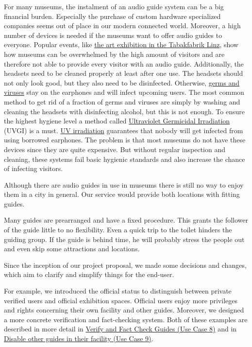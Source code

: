 \documentclass[12pt]{article}
\theoremstyle{definition}
\newenvironment{text}{
   \setlength{\parindent}{0pt}
   \color{black}
}{}
\begin{document}
\begin{text}
For many museums, the instalment of an audio guide system can be a big financial burden. Especially the purchase of custom hardware specialized companies seems out of place in our modern connected world. Moreover, a  high number of devices is needed if the museums want to offer audio guides to everyone. Popular events, like \href{https://www.tips.at/nachrichten/linz/kultur/459167-oberoesterreich-im-kunstfieber-schon-ueber-15-000-besucher-kamen-zu-den-grossen-meistern-in-die-tabakfabrik-linz}{the art exhibition in the Tabakfabrik Linz}, show how museums can be overwhelmed by the high amount of visitors and are therefore not able to provide every visitor with an audio guide.
Additionally, the headsets need to be cleaned properly at least after one use.
The headsets should not only look good, but they also need to be disinfected. Otherwise, \href{https://www.sciencedirect.com/science/article/abs/pii/S019607098580048X}{germs and viruses} stay on the earphones and will infect upcoming users. The most common method to get rid of a fraction of germs and viruses are simply by washing and cleaning the headsets with disinfecting alcohol, but this is not enough. To ensure the highest hygiene level a method called \href{https://www.ncbi.nlm.nih.gov/pmc/articles/PMC6379899/}{Ultraviolet Germicidal Irradiation} (UVGI) is a must. \href{https://pubs.asha.org/doi/abs/10.1044/jshr.1202.326}{UV irradiation} guarantees that nobody will get infected from using borrowed earphones. The problem is that most museums do not have these devices since they are quite expensive.
But without regular inspection and cleaning, these systems fail basic hygienic standards and also increase the chance of infecting visitors.
\newline

Although there are audio guides in use in museums there is still no way to enjoy them in a city in general. Our service would provide both locations with fitting guides.

Many guides are prearranged and have a fixed procedure. This grants the follower of the guide little to no flexibility. Even a quick trip to the toilet hinders the guiding group. If the guide is behind time, he will probably stress the people out and even skip some attractions and locations. \newline\newline

Since the inception of our project proposal, we made some decisions and changes, which aim to clarify and simplify things for the end-user. 

For example, we introduced the official status to distinguish between private verified users and official exhibition spaces. Official users enjoy more privileges and rights concerning their own facility and other guides. Moreover, we designed a more concrete verification and fact-checking system. Both of these examples are described in more detail in \hyperref[sec:verifyguides]{Verify and Fact Check Guides (Use Case 8)} and in
\hyperref[sec:disableguides]{ Disable other guides in their facility (Use Case 9)}.
\end{text}
\end{document}
